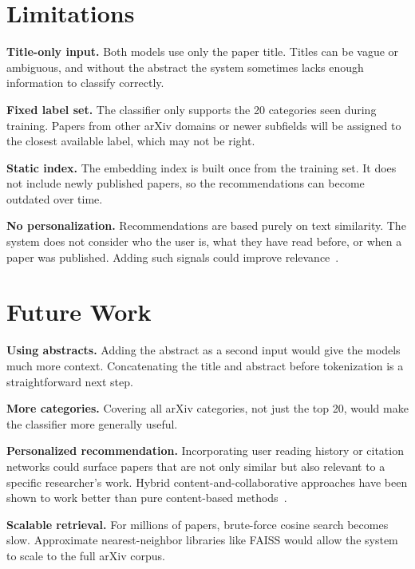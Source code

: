 \documentclass[conference]{IEEEtran}
\begin{document}
\section{Limitations}
\label{sec:limitations}

\textbf{Title-only input.}  Both models use only the paper title.
Titles can be vague or ambiguous, and without the abstract the
system sometimes lacks enough information to classify correctly.

\textbf{Fixed label set.}  The classifier only supports the 20
categories seen during training.  Papers from other arXiv domains
or newer subfields will be assigned to the closest available label,
which may not be right.

\textbf{Static index.}  The embedding index is built once from the
training set.  It does not include newly published papers, so the
recommendations can become outdated over time.

\textbf{No personalization.}  Recommendations are based purely on
text similarity.  The system does not consider who the user is,
what they have read before, or when a paper was published.  Adding
such signals could improve relevance~\cite{beel2016paper}.

\section{Future Work}
\label{sec:future}

\textbf{Using abstracts.}  Adding the abstract as a second input
would give the models much more context.  Concatenating the title
and abstract before tokenization is a straightforward next step.

\textbf{More categories.}  Covering all arXiv categories, not just
the top 20, would make the classifier more generally useful.

\textbf{Personalized recommendation.}  Incorporating user reading
history or citation networks could surface papers that are not only
similar but also relevant to a specific researcher's work.  Hybrid
content-and-collaborative approaches have been shown to work better
than pure content-based methods~\cite{beel2016paper}.

\textbf{Scalable retrieval.}  For millions of papers, brute-force
cosine search becomes slow.  Approximate nearest-neighbor libraries
like FAISS would allow the system to scale to the full arXiv corpus.
\end{document}
